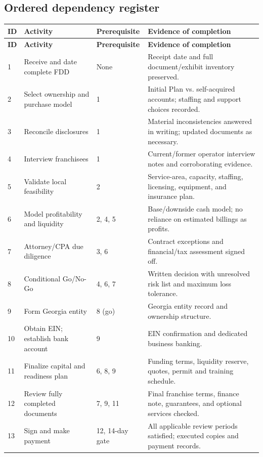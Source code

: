 \documentclass[10pt,letterpaper]{article}
\begin{document}
\subsection{Ordered dependency register}
{\small
\begin{longtable}{@{}p{.08\linewidth}p{.245\linewidth}p{.13\linewidth}p{.44\linewidth}@{}}
\toprule
\textbf{ID} & \textbf{Activity} & \textbf{Prerequisite} & \textbf{Evidence of completion}\\\midrule
\endfirsthead
\toprule\textbf{ID}&\textbf{Activity}&\textbf{Prerequisite}&\textbf{Evidence of completion}\\\midrule
\endhead
1 & Receive and date complete FDD & None & Receipt date and full document/exhibit inventory preserved.\\
2 & Select ownership and purchase model & 1 & Initial Plan vs. self-acquired accounts; staffing and support choices recorded.\\
3 & Reconcile disclosures & 1 & Material inconsistencies answered in writing; updated documents as necessary.\\
4 & Interview franchisees & 1 & Current/former operator interview notes and corroborating evidence.\\
5 & Validate local feasibility & 2 & Service-area, capacity, staffing, licensing, equipment, and insurance plan.\\
6 & Model profitability and liquidity & 2, 4, 5 & Base/downside cash model; no reliance on estimated billings as profits.\\
7 & Attorney/CPA due diligence & 3, 6 & Contract exceptions and financial/tax assessment signed off.\\
8 & Conditional Go/No-Go & 4, 6, 7 & Written decision with unresolved risk list and maximum loss tolerance.\\
9 & Form Georgia entity & 8 (go) & Georgia entity record and ownership structure.\\
10 & Obtain EIN; establish bank account & 9 & EIN confirmation and dedicated business banking.\\
11 & Finalize capital and readiness plan & 6, 8, 9 & Funding terms, liquidity reserve, quotes, permit and training schedule.\\
12 & Review fully completed documents & 7, 9, 11 & Final franchise terms, finance note, guarantees, and optional services checked.\\
13 & Sign and make payment & 12, 14-day gate & All applicable review periods satisfied; executed copies and payment records.\\
\bottomrule
\end{longtable}}
\end{document}
